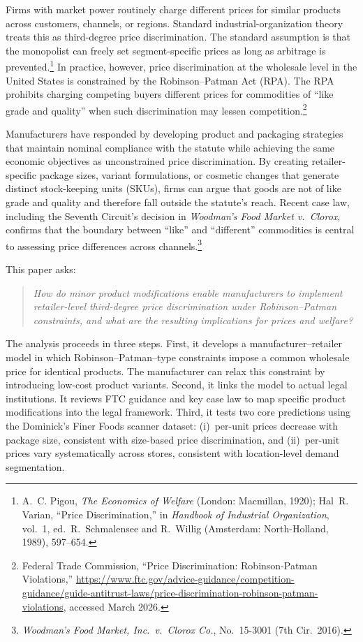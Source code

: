 \documentclass[12pt]{article}
\theoremstyle{definition}
\begin{document}
Firms with market power routinely charge different prices for similar products across customers, channels, or regions.
Standard industrial-organization theory treats this as third-degree price discrimination. The standard assumption is that the monopolist can freely set segment-specific prices as long as arbitrage is prevented.\footnote{A.~C. Pigou, \textit{The Economics of Welfare} (London: Macmillan, 1920); Hal~R. Varian, ``Price Discrimination,'' in \textit{Handbook of Industrial Organization}, vol.~1, ed.\ R.~Schmalensee and R.~Willig (Amsterdam: North-Holland, 1989), 597--654.}
In practice, however, price discrimination at the wholesale level in the United States is constrained by the Robinson--Patman Act (RPA). The RPA prohibits charging competing buyers different prices for commodities of ``like grade and quality'' when such discrimination may lessen competition.\footnote{Federal Trade Commission, ``Price Discrimination: Robinson-Patman Violations,'' \url{https://www.ftc.gov/advice-guidance/competition-guidance/guide-antitrust-laws/price-discrimination-robinson-patman-violations}, accessed March 2026.}

Manufacturers have responded by developing product and packaging strategies that maintain nominal compliance with the statute while achieving the same economic objectives as unconstrained price discrimination.
By creating retailer-specific package sizes, variant formulations, or cosmetic changes that generate distinct stock-keeping units (SKUs), firms can argue that goods are not of like grade and quality and therefore fall outside the statute's reach.
Recent case law, including the Seventh Circuit's decision in \textit{Woodman's Food Market v.\ Clorox}, confirms that the boundary between ``like'' and ``different'' commodities is central to assessing price differences across channels.\footnote{\textit{Woodman's Food Market, Inc.\ v.\ Clorox Co.}, No.\ 15-3001 (7th Cir.\ 2016).}

This paper asks:
\begin{quote}
\textit{How do minor product modifications enable manufacturers to implement retailer-level third-degree price discrimination under Robinson--Patman constraints, and what are the resulting implications for prices and welfare?}
\end{quote}

The analysis proceeds in three steps.
First, it develops a manufacturer--retailer model in which Robinson--Patman--type constraints impose a common wholesale price for identical products. The manufacturer can relax this constraint by introducing low-cost product variants.
Second, it links the model to actual legal institutions. It reviews FTC guidance and key case law to map specific product modifications into the legal framework.
Third, it tests two core predictions using the Dominick's Finer Foods scanner dataset: (i)~per-unit prices decrease with package size, consistent with size-based price discrimination, and (ii)~per-unit prices vary systematically across stores, consistent with location-level demand segmentation.
\end{document}
